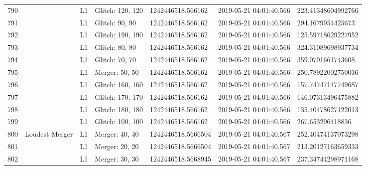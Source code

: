 \begin{longtable}{lllllll}
790  &                                                    &       L1 &  Glitch: 120, 120 &   1242446518.566162 &  2019-05-21 04:01:40.566 &  223.41348604992766 \\
791  &                                                    &       L1 &    Glitch: 90, 90 &   1242446518.566162 &  2019-05-21 04:01:40.566 &   294.1679954425673 \\
792  &                                                    &       L1 &  Glitch: 190, 190 &   1242446518.566162 &  2019-05-21 04:01:40.566 &  125.59718629227952 \\
793  &                                                    &       L1 &    Glitch: 80, 80 &   1242446518.566162 &  2019-05-21 04:01:40.566 &  324.31089698937734 \\
794  &                                                    &       L1 &    Glitch: 70, 70 &   1242446518.566162 &  2019-05-21 04:01:40.566 &   359.0791661743608 \\
795  &                                                    &       L1 &    Merger: 50, 50 &   1242446518.566162 &  2019-05-21 04:01:40.566 &  250.78922002750036 \\
796  &                                                    &       L1 &  Glitch: 160, 160 &   1242446518.566162 &  2019-05-21 04:01:40.566 &  157.74747147749687 \\
797  &                                                    &       L1 &  Glitch: 170, 170 &   1242446518.566162 &  2019-05-21 04:01:40.566 &  146.07313496475882 \\
798  &                                                    &       L1 &  Glitch: 180, 180 &   1242446518.566162 &  2019-05-21 04:01:40.566 &  135.40478627122013 \\
799  &                                                    &       L1 &  Glitch: 100, 100 &   1242446518.566162 &  2019-05-21 04:01:40.566 &    267.653296418836 \\
800  &                                     Loudest Merger &       L1 &    Merger: 40, 40 &  1242446518.5666504 &  2019-05-21 04:01:40.567 &  252.40474137073298 \\
801  &                                                    &       L1 &    Merger: 20, 20 &  1242446518.5666504 &  2019-05-21 04:01:40.567 &  213.20127163659333 \\
802  &                                                    &       L1 &    Merger: 30, 30 &  1242446518.5668945 &  2019-05-21 04:01:40.567 &  237.34744298971168 \\

\end{longtable}
